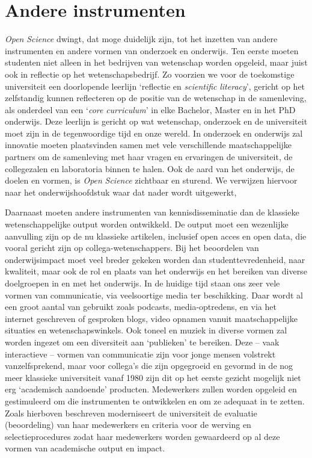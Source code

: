 \documentclass[smallauthor, chapterhaspagenum, nochapterinheader, pagenuminheader,  bigchapnum,medium2, tocpages, garamond, titleinheader]{jote-book}
\begin{document}
	\section{Andere instrumenten}



	\emph{Open }\emph{Science} dwingt, dat moge duidelijk zijn, tot het inzetten van andere instrumenten en andere vormen van onderzoek en onderwijs. Ten eerste moeten studenten niet alleen in het bedrijven van wetenschap worden opgeleid, maar juist ook in reflectie op het wetenschapsbedrijf. Zo voorzien we voor de toekomstige universiteit een doorlopende leerlijn ‘reflectie en \emph{scientific}\emph{ }\emph{literacy}', gericht op het zelfstandig kunnen reflecteren op de positie van de wetenschap in de samenleving, als onderdeel van een ‘\emph{core}\emph{ curriculum}' in elke Bachelor, Master en in het PhD onderwijs. Deze leerlijn is gericht op wat wetenschap, onderzoek en de universiteit moet zijn in de tegenwoordige tijd en onze wereld. In onderzoek en onderwijs zal innovatie moeten plaatsvinden samen met vele verschillende maatschappelijke partners om de samenleving met haar vragen en ervaringen de universiteit, de collegezalen en laboratoria binnen te halen. Ook de aard van het onderwijs, de doelen en vormen, is \emph{Open }\emph{Science} zichtbaar en sturend. We verwijzen hiervoor naar het onderwijshoofdstuk waar dat nader wordt uitgewerkt,



	Daarnaast moeten andere instrumenten van kennisdisseminatie dan de klassieke wetenschappelijke output worden ontwikkeld. De output moet een wezenlijke aanvulling zijn op de nu klassieke artikelen, inclusief open acces en open data, die vooral gericht zijn op collega-wetenschappers. Bij het beoordelen van onderwijsimpact moet veel breder gekeken worden dan studenttevredenheid, naar kwaliteit, maar ook de rol en plaats van het onderwijs en het bereiken van diverse doelgroepen in en met het onderwijs. In de huidige tijd staan ons zeer vele vormen van communicatie, via veelsoortige media ter beschikking. Daar wordt al een groot aantal van gebruikt zoals podcasts, media-optredens, en via het internet geschreven of gesproken blogs, video opnamen vanuit maatschappelijke situaties en wetenschapswinkels. Ook toneel en muziek in diverse vormen zal worden ingezet om een diversiteit aan ‘publieken' te bereiken. Deze -- vaak interactieve -- vormen van communicatie zijn voor jonge mensen volstrekt vanzelfsprekend, maar voor collega's die zijn opgegroeid en gevormd in de nog meer klassieke universiteit vanaf 1980 zijn dit op het eerste gezicht mogelijk niet erg ‘academisch aandoende' producten. Medewerkers zullen worden opgeleid en gestimuleerd om die instrumenten te ontwikkelen en om ze adequaat in te zetten. Zoals hierboven beschreven moderniseert de universiteit de evaluatie (beoordeling) van haar medewerkers en criteria voor de werving en selectieprocedures zodat haar medewerkers worden gewaardeerd op al deze vormen van academische output en impact.
\end{document}
